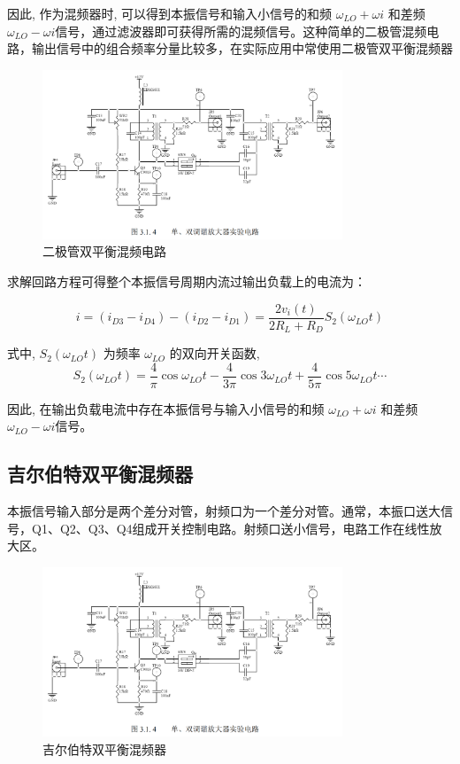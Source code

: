 \documentclass{../source/Experiment}
\begin{document}
因此, 作为混频器时, 可以得到本振信号和输入小信号的和频 $\omega_{LO} + \omega i$ 和差频 $\omega_{LO} − \omega i$信号，通过滤波器即可获得所需的混频信号。这种简单的二极管混频电路，输出信号中的组合频率分量比较多，在实际应用中常使用二极管双平衡混频器
\begin{figure}[H]
    \centering
    \includegraphics[width = 0.8\textwidth]{pic/fig2.png}
    \caption{二极管双平衡混频电路}
\end{figure}

求解回路方程可得整个本振信号周期内流过输出负载上的电流为：

$$
    i=\left(i_{D 3}-i_{D 4}\right)-\left(i_{D 2}-i_{D 1}\right)=\frac{2 v_{i}(t)}{2 R_{L}+R_{D}} S_{2}\left(\omega_{L O} t\right)
$$

式中, $ S_2 (\omega_{LO}t)$ 为频率 $\omega_{LO}$ 的双向开关函数,
$$
    S_{2}\left(\omega_{L O} t\right)=\frac{4}{\pi} \cos \omega_{L O} t-\frac{4}{3 \pi} \cos 3 \omega_{L O} t+\frac{4}{5 \pi} \cos 5 \omega_{L O} t \cdots
$$

因此, 在输出负载电流中存在本振信号与输入小信号的和频 $\omega_{LO} + \omega i$ 和差频 $\omega_{LO} − \omega i$信号。

\subsection{吉尔伯特双平衡混频器}

本振信号输入部分是两个差分对管，射频口为一个差分对管。通常，本振口送大信号，Q1、Q2、Q3、Q4组成开关控制电路。射频口送小信号，电路工作在线性放大区。

\begin{figure}[H]
    \centering
    \includegraphics[width = 0.8\textwidth]{pic/fig2.png}
    \caption{吉尔伯特双平衡混频器}
\end{figure}
\end{document}
